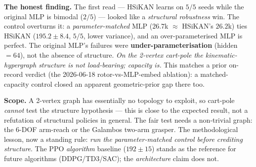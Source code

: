 \documentclass[11pt]{article}
\begin{document}
\textbf{The honest finding.} The first read --- HSiKAN learns on $5/5$ seeds while the original MLP is bimodal
($2/5$) --- looked like a \emph{structural robustness} win. The control overturns it: a \emph{parameter-matched}
MLP ($26.7$k $\approx$ HSiKAN's $26.2$k) ties HSiKAN ($195.2\pm8.4$, $5/5$, lower variance), and an
over-parameterised MLP is perfect. The original MLP's failures were \textbf{under-parameterisation}
(hidden$=64$), not the absence of structure. \emph{On the 2-vertex cart-pole the kinematic-hypergraph
structure is not load-bearing; capacity is.} This matches a prior on-record verdict (the 2026-06-18
rotor-vs-MLP-embed ablation): a matched-capacity control closed an apparent geometric-prior gap there too.

\textbf{Scope.} A 2-vertex graph has essentially no topology to exploit, so cart-pole \emph{cannot} test the
structure hypothesis --- this is close to the expected result, not a refutation of structural policies in
general. The fair test needs a non-trivial graph: the 6-DOF arm-reach or the Galambos two-arm grasper. The
methodological lesson, now a standing rule: \emph{run the parameter-matched control before crediting
structure}. The PPO \emph{algorithm} baseline ($192\pm15$) stands as the reference for future
algorithms (DDPG/TD3/SAC); the \emph{architecture} claim does not.
\end{document}
